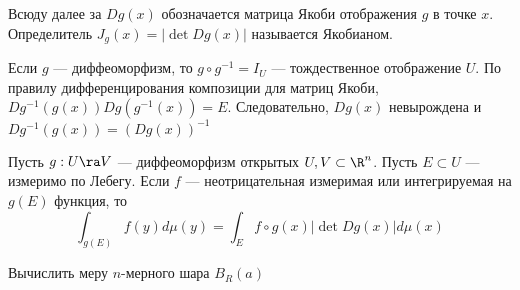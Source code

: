 \begin{definition}
    Всюду далее за \(Dg(x)\) обозначается матрица Якоби отображения \(g\) в точке \(x\). Определитель \(J_g(x) = |\det Dg(x)|\) называется Якобианом.
\end{definition}

\begin{definition}
    Если \(g\) --- диффеоморфизм, то \(g\circ g^{-1} = I_U\) --- тождественное отображение \(U\). По правилу дифференцирования композиции для матриц Якоби, \(Dg^{-1}(g(x))Dg(g^{-1}(x)) = E\). Следовательно, \(Dg(x)\) невырождена и \(Dg^{-1}(g(x)) = (Dg(x))^{-1}\)
\end{definition}

\begin{theorem}
    Пусть \(g: U \ra V\) --- диффеоморфизм открытых \(U, V \subset \R^n\). Пусть \(E \subset U\) --- измеримо по Лебегу. Если \(f\) --- неотрицательная измеримая или интегрируемая на \(g(E)\) функция, то
    \[\int_{g(E)} f(y) d\mu(y) = \int_E f \circ g(x) |\det Dg(x)|d\mu(x)\]
\end{theorem}
\begin{example}
    Вычислить меру \(n\)-мерного шара \(B_R(a)\)
\end{example}
